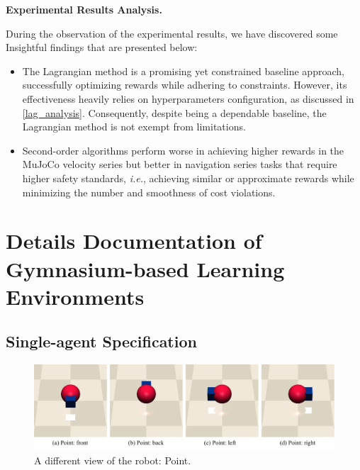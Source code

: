\documentclass{article}
\begin{document}
\textbf{Experimental Results Analysis.}

During the observation of the experimental results, we have discovered some Insightful findings that are presented below:

\begin{itemize}
    \item The Lagrangian method is a promising yet constrained baseline approach, successfully optimizing rewards while adhering to constraints. However, its effectiveness heavily relies on hyperparameters configuration, as discussed in \autoref{lag_analysis}. Consequently, despite being a dependable baseline, the Lagrangian method is not exempt from limitations.
    \item Second-order algorithms perform worse in achieving higher rewards in the MuJoCo velocity series but better in navigation series tasks that require higher safety standards, \textit{i.e.}, achieving similar or approximate rewards while minimizing the number and smoothness of cost violations.
\end{itemize}



\newpage
\section{Details Documentation of Gymnasium-based Learning Environments}
\label{app:environment}
\subsection{Single-agent Specification}

\begin{figure}[H]
  \centering
  \includegraphics[width=0.6\linewidth]{assets/appendix/Point.pdf}
  \caption{A different view of the robot: Point.}
  \label{pic: point}
\end{figure}
\begin{table}[H]
\caption{The overall information of Point}
\label{pic:overall_point}
\centering
{}
\end{table}
\end{document}
